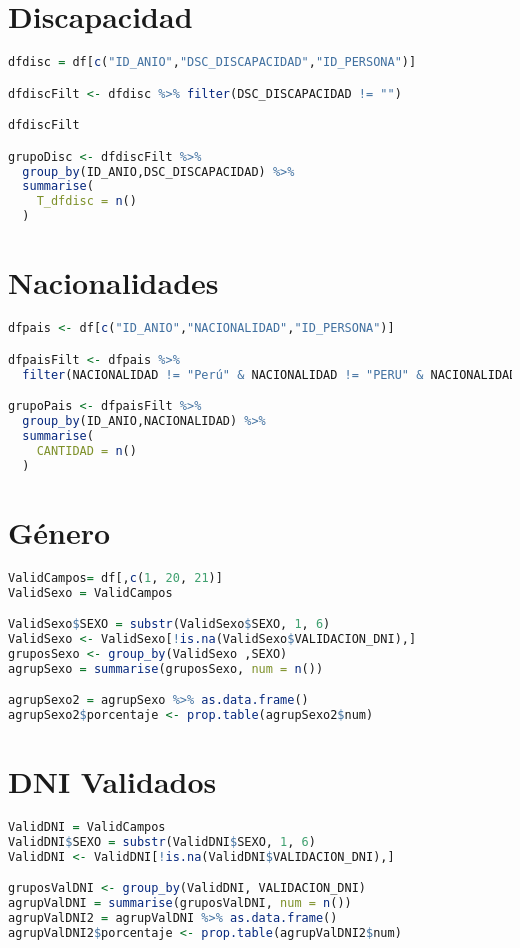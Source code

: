 \section{Discapacidad}\label{cod_discapacidad}
\begin{lstlisting}[language=R]
dfdisc = df[c("ID_ANIO","DSC_DISCAPACIDAD","ID_PERSONA")]

dfdiscFilt <- dfdisc %>% filter(DSC_DISCAPACIDAD != "")

dfdiscFilt

grupoDisc <- dfdiscFilt %>%
  group_by(ID_ANIO,DSC_DISCAPACIDAD) %>%
  summarise(
    T_dfdisc = n()
  )
\end{lstlisting}

\section{Nacionalidades}\label{cod_nacionalidades}
\begin{lstlisting}[language=R]
dfpais <- df[c("ID_ANIO","NACIONALIDAD","ID_PERSONA")]

dfpaisFilt <- dfpais %>%
  filter(NACIONALIDAD != "Perú" & NACIONALIDAD != "PERU" & NACIONALIDAD != " " & NACIONALIDAD != "")

grupoPais <- dfpaisFilt %>%
  group_by(ID_ANIO,NACIONALIDAD) %>%
  summarise(
    CANTIDAD = n()
  )
\end{lstlisting}

\section{Género}\label{cod_genero}
\begin{lstlisting}[language=R]
ValidCampos= df[,c(1, 20, 21)]
ValidSexo = ValidCampos

ValidSexo$SEXO = substr(ValidSexo$SEXO, 1, 6)
ValidSexo <- ValidSexo[!is.na(ValidSexo$VALIDACION_DNI),]
gruposSexo <- group_by(ValidSexo ,SEXO)
agrupSexo = summarise(gruposSexo, num = n())

agrupSexo2 = agrupSexo %>% as.data.frame()
agrupSexo2$porcentaje <- prop.table(agrupSexo2$num)
\end{lstlisting}

\section{DNI Validados}\label{cod_dnivalidados}
\begin{lstlisting}[language=R]
ValidDNI = ValidCampos
ValidDNI$SEXO = substr(ValidDNI$SEXO, 1, 6)
ValidDNI <- ValidDNI[!is.na(ValidDNI$VALIDACION_DNI),]

gruposValDNI <- group_by(ValidDNI, VALIDACION_DNI)
agrupValDNI = summarise(gruposValDNI, num = n())
agrupValDNI2 = agrupValDNI %>% as.data.frame()
agrupValDNI2$porcentaje <- prop.table(agrupValDNI2$num)
\end{lstlisting}

